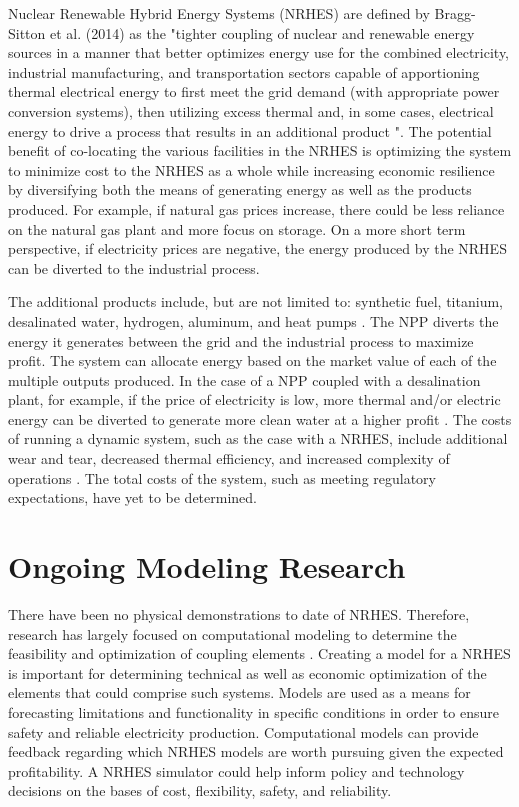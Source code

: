 \documentclass[12pt]{UIdahoMastersThesis}
\begin{document}
Nuclear Renewable Hybrid Energy Systems (NRHES) are defined by Bragg-Sitton et al. (2014) as the "tighter coupling of nuclear and renewable energy sources in a manner that better optimizes energy use for the combined electricity, industrial manufacturing, and transportation sectors capable of apportioning thermal electrical energy to first meet the grid demand (with appropriate power conversion systems), then utilizing excess thermal and, in some cases, electrical energy to drive a process that results in an additional product \cite {Bragg-Sitton2014}".  The potential benefit of co-locating the various facilities in the NRHES is optimizing the system to minimize cost to the NRHES as a whole while increasing economic resilience by diversifying both the means of generating energy as well as the products produced. For example, if natural gas prices increase, there could be less reliance on the natural gas plant and more focus on storage.  On a more short term perspective, if electricity prices are negative, the energy produced by the NRHES can be diverted to the industrial process.

The additional products include, but are not limited to: synthetic fuel, titanium, desalinated water, hydrogen, aluminum, and heat pumps \cite{Bienvenue2015}. The NPP diverts the energy it generates between the grid and the industrial process to maximize profit. The system can allocate energy based on the market value of each of the multiple outputs produced. In the case of a NPP coupled with a desalination plant, for example, if the price of electricity is low, more thermal and/or electric energy can be diverted to generate more clean water at a higher profit \cite {Chen2016}. The costs of running a dynamic system, such as the case with a NRHES, include additional wear and tear, decreased thermal efficiency, and increased complexity of operations \cite{Garcia2013}. The total costs of the system, such as meeting regulatory expectations, have yet to be determined.

\chapter{Ongoing Modeling Research}
There have been no physical demonstrations to date of NRHES. Therefore, research has largely focused on computational modeling to determine the feasibility and optimization of coupling elements \cite{Boardman2013, Shropshire2012}. Creating a model for a NRHES is important for determining technical as well as economic optimization of the elements that could comprise such systems. Models are used as a means for forecasting limitations and functionality in specific conditions in order to ensure safety and reliable electricity production. Computational models can provide feedback regarding which NRHES models are worth pursuing given the expected profitability. A NRHES simulator could help inform policy and technology decisions on the bases of cost, flexibility, safety, and reliability.
\end{document}
